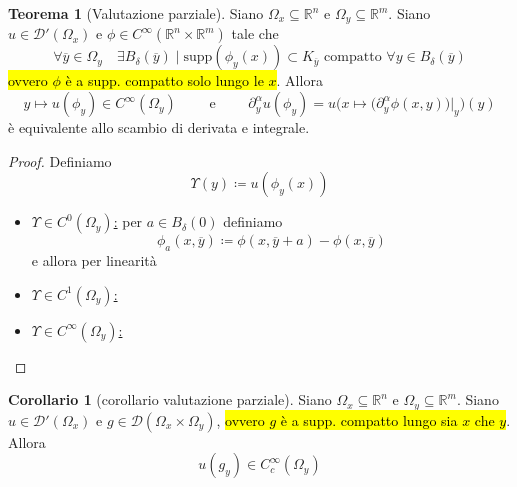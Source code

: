 \documentclass[a4paper,10pt]{article}
\theoremstyle{definition}
\newcommand{\re}{\mathbb{R}} %
\newcommand{\supp}{\text{supp}} %
\theoremstyle{indentdefinition}
\theoremstyle{indenttheorem}
\newtheorem{thm}{Teorema}
\newtheorem{cor}{Corollario}
\theoremstyle{myremark}
\theoremstyle{indentgeneral}
\newenvironment{myboxed} 
{\noindent\begin{lrbox}{\mybox}\begin{minipage}{\textwidth}}
{\end{minipage}\end{lrbox}\fbox{\usebox{\mybox}}}
\begin{document}
    \begin{myboxed}
        \begin{thm}[Valutazione parziale]\label{thm-valutazione-parziale} Siano $\Omega_x\subseteq \re^n$ e $\Omega_y\subseteq \re^m$. Siano $u\in \mathcal{D}'(\Omega_x)$ e $\phi\in C^\infty(\re^n\times\re^m)$ tale che 
        $$\forall \overline{y}\in \Omega_y\quad \exists B_\delta(\overline{y})\mid \supp(\phi_y(x))\subset K_{\overline{y}}\text{ compatto }\forall y\in B_\delta(\overline{y})$$
        \hl{ovvero $\phi$ è a supp. compatto solo lungo le $x$}. Allora $$y\mapsto u(\phi_y)\in C^\infty(\Omega_y)\qquad\text{ e }\qquad \partial^\alpha_yu(\phi_y)=u\bigg(x\mapsto\big(\partial^\alpha_y\phi(x,y)\big)|_y\bigg)(y)$$
            è equivalente allo scambio di derivata e integrale.
        \end{thm}
    \end{myboxed}
\begin{proof}
    Definiamo 
    $$\Upsilon(y)\coloneqq u(\phi_y(x))$$
    \begin{itemize}
        \item \underline{$\Upsilon\in C^0(\Omega_y)$:} per $a\in B_\delta(0)$ definiamo $$\phi_a(x,\overline{y})\coloneqq\phi(x,\overline{y}+a)-\phi(x,\overline{y})$$
        e allora per linearità
        \item \underline{$\Upsilon\in C^1(\Omega_y)$:}
        \item \underline{$\Upsilon\in C^\infty(\Omega_y)$:}
    \end{itemize}
\end{proof}
\begin{cor}[corollario valutazione parziale] \label{cor-valutazione-parziale}
    Siano $\Omega_x\subseteq \re^n$ e $\Omega_y\subseteq \re^m$. Siano $u\in \mathcal{D}'(\Omega_x)$ e $g\in \mathcal{D}(\Omega_x\times\Omega_y)$, \hl{ovvero $g$ è a supp. compatto lungo sia $x$ che $y$}. Allora
    $$u(g_y)\in C_c^\infty(\Omega_y)$$
\end{cor}
\end{document}
